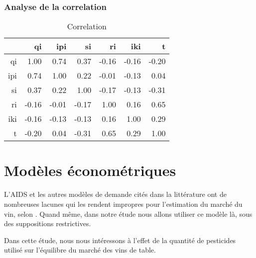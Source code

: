 \documentclass[11pt, a4paper]{article}
\begin{document}
\subsubsection{Analyse de la correlation}
\FloatBarrier
\begin{table}[!htbp]
  \centering
\begin{tabular}{r|rrrrrr}
  \hline
  \hline
 & qi & ipi & si & ri & iki & t \\ 
  \hline
qi & 1.00 & 0.74 & 0.37 & -0.16 & -0.16 & -0.20 \\ 
  ipi & 0.74 & 1.00 & 0.22 & -0.01 & -0.13 & 0.04 \\ 
  si & 0.37 & 0.22 & 1.00 & -0.17 & -0.13 & -0.31 \\ 
  ri & -0.16 & -0.01 & -0.17 & 1.00 & 0.16 & 0.65 \\ 
  iki & -0.16 & -0.13 & -0.13 & 0.16 & 1.00 & 0.29 \\ 
  t & -0.20 & 0.04 & -0.31 & 0.65 & 0.29 & 1.00 \\ 
   \hline
\end{tabular}
\caption{Correlation}
\end{table}
\FloatBarrier

\section{Modèles économétriques}
L'AIDS et les autres modèles de demande cités dans la littérature ont de nombreuses lacunes qui les rendent impropres pour l'estimation du marché du vin, selon \citet{cembalo2014}. 
Quand même, dans notre étude nous allons utiliser ce modèle là, sous des suppositions restrictives. 
\par
Dans cette étude, nous nous intéressons à l’effet de la quantité de pesticides utilisé sur l’équilibre du marché des vins de table.
\end{document}
